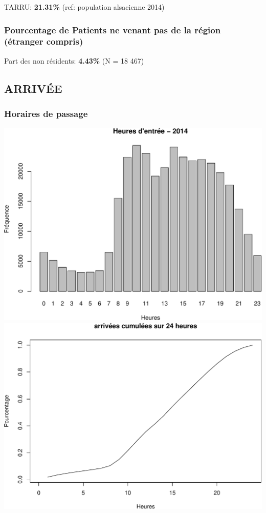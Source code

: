 \documentclass[]{article}
\begin{document}
TARRU: \textbf{21.31\%} (ref: population alsacienne 2014)

\subsubsection{Pourcentage de Patients ne venant pas de la région
(étranger
compris)}\label{pourcentage-de-patients-ne-venant-pas-de-la-region-etranger-compris}

Part des non résidents: \textbf{4.43\%} (N = 18 467)

\subsection{ARRIVÉE}\label{arrivee}

\subsubsection{Horaires de passage}\label{horaires-de-passage}

\includegraphics{rapport2014_V4_files/figure-latex/horaires-1.pdf}
\includegraphics{rapport2014_V4_files/figure-latex/horaires-2.pdf}
\end{document}
